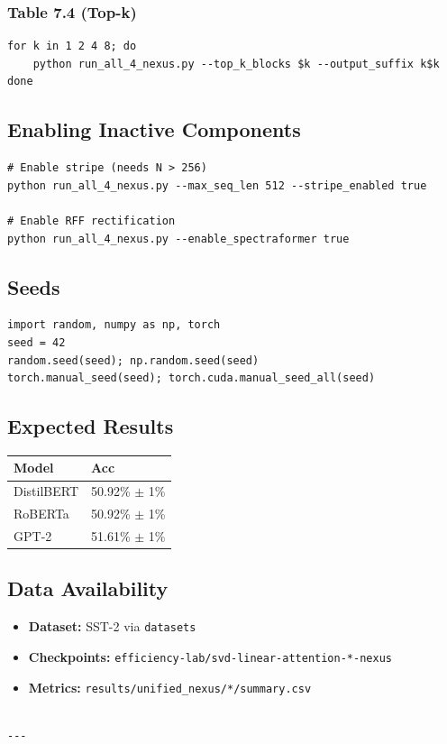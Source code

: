 \subsubsection{Table 7.4 (Top-k)}
\begin{lstlisting}
for k in 1 2 4 8; do
    python run_all_4_nexus.py --top_k_blocks $k --output_suffix k$k
done
\end{lstlisting}

\subsection{Enabling Inactive Components}

\begin{lstlisting}
# Enable stripe (needs N > 256)
python run_all_4_nexus.py --max_seq_len 512 --stripe_enabled true

# Enable RFF rectification
python run_all_4_nexus.py --enable_spectraformer true
\end{lstlisting}

\subsection{Seeds}

\begin{lstlisting}
import random, numpy as np, torch
seed = 42
random.seed(seed); np.random.seed(seed)
torch.manual_seed(seed); torch.cuda.manual_seed_all(seed)
\end{lstlisting}

\subsection{Expected Results}

\begin{table}[H]
\centering
\small
\begin{tabular}{ll}
\toprule
\textbf{Model} & \textbf{Acc} \\
\midrule
DistilBERT & 50.92\% $\pm$ 1\% \\
RoBERTa & 50.92\% $\pm$ 1\% \\
GPT-2 & 51.61\% $\pm$ 1\% \\
\bottomrule
\end{tabular}
\end{table}

\subsection{Data Availability}

\begin{itemize}
\item \textbf{Dataset:} SST-2 via \texttt{datasets}
\item \textbf{Checkpoints:} \texttt{efficiency-lab/svd-linear-attention-*-nexus}
\item \textbf{Metrics:} \texttt{results/unified\_nexus/*/summary.csv}
\end{itemize}
\begin{lstlisting}

---
\end{lstlisting}